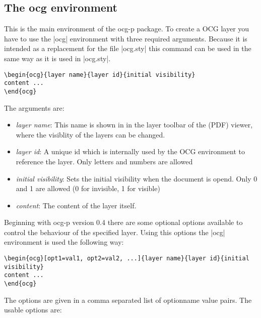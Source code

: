 \documentclass[a4paper]{ltxdoc}
\newcommand*{\pkg}[1]{\textsf{#1}}
\begin{document}
\subsection{The ocg environment}
This is the main environment of the  \pkg{ocg-p} package.
To create a OCG layer you have to use the |ocg| environment with three required arguments. Because it is intended as a replacement for the file |ocg.sty| this command can be used in the same way as it is used in |ocg.sty|.
\begin{verbatim}
\begin{ocg}{layer name}{layer id}{initial visibility}
content ...
\end{ocg}
 \end{verbatim}
The arguments are:
 \begin{itemize} 
 \item \textit{layer name}:
This name is shown in in the layer toolbar of the (PDF) viewer, where the visiblity of the layers can be changed.
 \item \textit{layer id}:
A unique id which is internally used by the OCG environment to reference the layer. Only letters and numbers are allowed
 \item \textit{initial visibility}:
Sets the initial visibility when the document is opend. Only 0 and 1 are allowed (0 for invisible, 1 for visible)
 \item \textit{content}:
The content of the layer itself.
 \end{itemize}

Beginning with \pkg{ocg-p} version 0.4 there are some optional options available to control the behaviour of the specified  layer. Using this options the |ocg| environment is used the following way:
\begin{verbatim}
\begin{ocg}[opt1=val1, opt2=val2, ...]{layer name}{layer id}{initial visibility}
content ...
\end{ocg}
 \end{verbatim}
The options are given in a comma separated list of optionname value pairs.
The usable options are:
\end{document}
